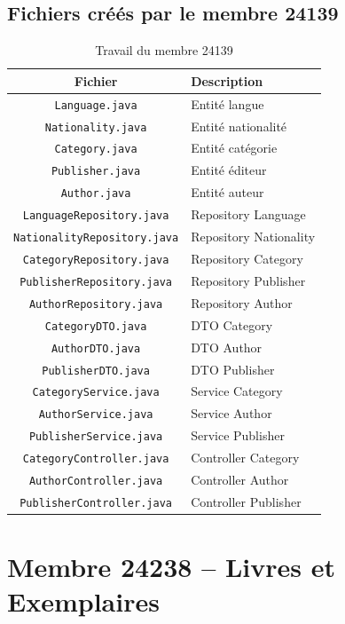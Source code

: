 \documentclass[12pt,a4paper,twoside]{report}
\begin{document}
\subsection{Fichiers créés par le membre 24139}

\begin{table}[H]
\centering
\caption{Travail du membre 24139}
\begin{tabularx}{\textwidth}{c X}
\hline
\rowcolor[gray]{0.9}
\textbf{Fichier} & \textbf{Description} \\
\hline
\texttt{Language.java} & Entité langue \\
\texttt{Nationality.java} & Entité nationalité \\
\texttt{Category.java} & Entité catégorie \\
\texttt{Publisher.java} & Entité éditeur \\
\texttt{Author.java} & Entité auteur \\
\texttt{LanguageRepository.java} & Repository Language \\
\texttt{NationalityRepository.java} & Repository Nationality \\
\texttt{CategoryRepository.java} & Repository Category \\
\texttt{PublisherRepository.java} & Repository Publisher \\
\texttt{AuthorRepository.java} & Repository Author \\
\texttt{CategoryDTO.java} & DTO Category \\
\texttt{AuthorDTO.java} & DTO Author \\
\texttt{PublisherDTO.java} & DTO Publisher \\
\texttt{CategoryService.java} & Service Category \\
\texttt{AuthorService.java} & Service Author \\
\texttt{PublisherService.java} & Service Publisher \\
\texttt{CategoryController.java} & Controller Category \\
\texttt{AuthorController.java} & Controller Author \\
\texttt{PublisherController.java} & Controller Publisher \\
\hline
\end{tabularx}
\end{table}

\section{Membre 24238 -- Livres et Exemplaires}
\end{document}
